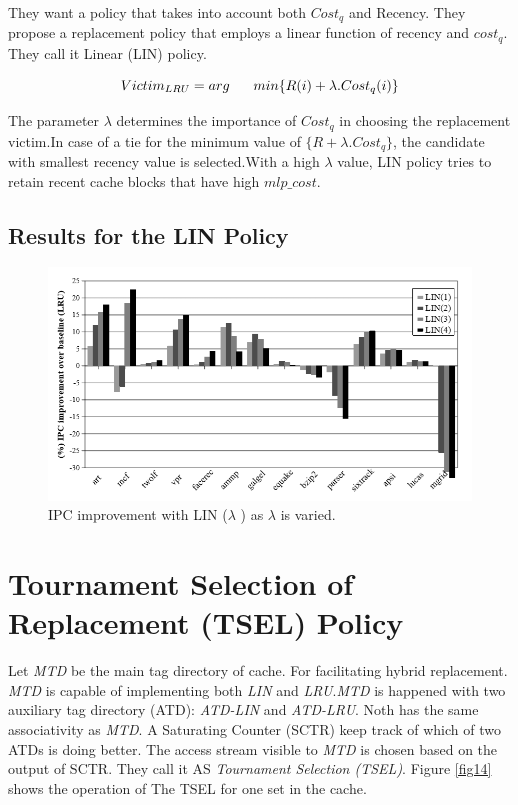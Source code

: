\documentclass{report}
\begin{document}
They want a policy that takes into account both $Cost_q$ and Recency. They propose a replacement policy that employs a linear function of recency and $cost_q$. They call it Linear (LIN) policy.

\vspace {1cm}
\begin{equation}
\vspace {1cm}
          Victim_{LRU} = arg \hspace*{.6cm} min \{ R(i) +\lambda.Cost_q(i)\}  
\end{equation}


The parameter $\lambda$ determines the importance of $Cost_q$ in choosing the replacement victim.In case of a tie for the minimum value of  $\{R+\lambda.Cost_q\}$, the candidate with smallest recency value is selected.With a high $\lambda$ value, LIN policy tries to retain recent cache blocks that have high $mlp\_cost$.

\subsection{ Results for the LIN Policy}
\begin{figure}[h!]
\includegraphics[width=1\textwidth]{./fig13}
\caption{ IPC improvement with LIN ($\lambda$ ) as $\lambda$ is varied.}
\label{fig13}

\end{figure}
\section{Tournament Selection of Replacement (TSEL) Policy}

Let \emph{MTD} be the main tag directory of cache. For facilitating hybrid replacement. \emph{MTD} is capable of implementing both \emph{LIN} and \emph{LRU}.\emph{MTD} is happened with two auxiliary tag directory (ATD): \emph{ATD-LIN} and \emph{ATD-LRU}. Noth has the same associativity as \emph{MTD}.  A Saturating Counter (SCTR) keep track of which of two ATDs is doing better. The access stream visible to \emph{MTD} is chosen based on the output of SCTR. They call it AS \emph{ Tournament Selection (TSEL)}. Figure \ref{fig14} shows the operation of The TSEL for one set in the cache.
\end{document}
